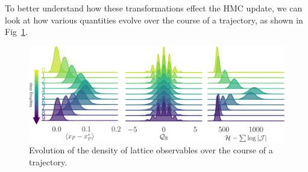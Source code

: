 \documentclass[a4paper,11pt]{article}
\begin{document}
%
To better understand how these transformations effect the HMC update, we can
look at how various quantities evolve over the course of a trajectory, as shown
in Fig~\ref{fig:ridgeplots}.
%
\begin{figure}[htpb]
    \centering
    \includegraphics[width=\textwidth]{assets/ridgeplots.pdf}
    \caption{\label{fig:ridgeplots}Evolution of the density of lattice
    observables over the course of a trajectory.}
\end{figure}





\end{document}
